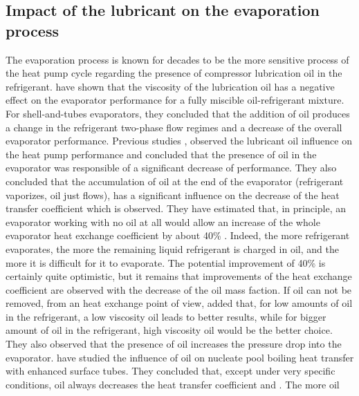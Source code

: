 \subsection{Impact of the lubricant on the evaporation
  process}
\label{sec:oil-ev}

The evaporation process is known for decades to be the more sensitive
process of the heat pump cycle regarding the presence of compressor
lubrication oil in the refrigerant. \citet{McMullan-Murphy-1992a} have
shown that the viscosity of the lubrication oil has a negative effect
on the evaporator performance for a fully miscible oil-refrigerant
mixture. For shell-and-tubes evaporators, they concluded that the
addition of oil produces a change in the refrigerant two-phase flow
regimes and a decrease of the overall evaporator performance. Previous
studies
\citep{McMullan-Hughes-1988b,McMullan-Hughes-1988a,Hughes-Morgan-1984a,Hughes-Morgan-1982a,Hughes-Sutcliffe-1980a,Hughes-Morgan-1984b},
observed the lubricant oil influence on the heat pump performance and
concluded that the presence of oil in the evaporator was responsible
of a significant decrease of performance. They also concluded that the
accumulation of oil at the end of the evaporator (refrigerant
vaporizes, oil just flows), has a significant influence on the
decrease of the heat transfer coefficient which is observed. They have
estimated that, in principle, an evaporator working with no oil at all
would allow an increase of the whole evaporator heat exchange
coefficient by about 40\%
\citep[p.\,123]{McMullan-Morgan-1983a}. Indeed, the more refrigerant
evaporates, the more the remaining liquid refrigerant is charged in
oil, and the more it is difficult for it to evaporate. The potential
improvement of 40\% is certainly quite optimistic, but it remains that
improvements of the heat exchange coefficient are observed with the
decrease of the oil mass faction. If oil can not be removed, from an
heat exchange point of view, \citet{McMullan-Morgan-1983a} added that,
for low amounts of oil in the refrigerant, a low viscosity oil leads
to better results, while for bigger amount of oil in the refrigerant,
high viscosity oil would be the better choice. They also observed that
the presence of oil increases the pressure drop into the
evaporator. \citet{Spindler-Hahne-2009a} have studied the influence of
oil on nucleate pool boiling heat transfer with enhanced surface
tubes. They concluded that, except under very specific conditions, oil
always decreases the heat transfer coefficient \citep[Fig.\,19
p.\,990]{Spindler-Hahne-2009a} and \citep{Moller-1998a}. The more oil
